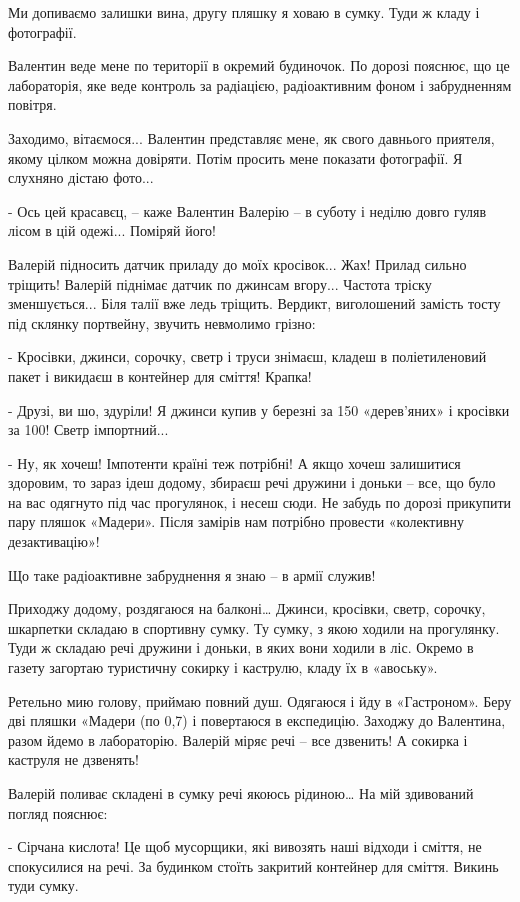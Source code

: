 Ми допиваємо залишки вина, другу пляшку я ховаю в сумку. Туди ж кладу і
фотографії. 

Валентин веде мене по території в окремий будиночок. По дорозі пояснює, що це
лабораторія, яке веде контроль за радіацією, радіоактивним фоном і забрудненням
повітря. 

Заходимо, вітаємося... Валентин представляє мене, як свого давнього приятеля,
якому цілком можна довіряти. Потім просить мене показати фотографії. Я слухняно
дістаю фото... 

- Ось цей красавєц, – каже Валентин Валерію – в суботу і неділю довго гуляв
лісом в цій одежі... Поміряй його!

Валерій підносить датчик приладу до моїх кросівок... Жах! Прилад сильно тріщить!
Валерій піднімає датчик по джинсам вгору... Частота тріску зменшується... Біля
талії вже ледь тріщить. Вердикт, виголошений замість тосту під склянку
портвейну, звучить невмолимо грізно:

- Кросівки, джинси, сорочку, светр і труси знімаєш, кладеш в поліетиленовий
пакет і викидаєш в контейнер для сміття! Крапка!

- Друзі, ви шо, здуріли! Я джинси купив у березні за 150 «дерев’яних» і
кросівки за 100! Светр імпортний... 

- Ну, як хочеш! Імпотенти країні теж потрібні! А якщо хочеш залишитися
здоровим, то зараз ідеш додому, збираєш речі дружини і доньки – все, що було на
вас одягнуто під час прогулянок, і несеш сюди. Не забудь по дорозі прикупити
пару пляшок «Мадери». Після замірів нам потрібно провести «колективну
дезактивацію»!

Що таке радіоактивне забруднення я знаю – в армії служив!

Приходжу додому, роздягаюся на балконі… Джинси, кросівки, светр, сорочку,
шкарпетки складаю в спортивну сумку. Ту сумку, з якою ходили на прогулянку.
Туди ж складаю речі дружини і доньки, в яких вони ходили в ліс. Окремо в газету
загортаю туристичну сокирку і каструлю, кладу їх в «авоську». 

Ретельно мию голову, приймаю повний душ. Одягаюся і йду в «Гастроном». Беру дві
пляшки «Мадери (по 0,7) і повертаюся в експедицію. Заходжу до Валентина, разом
йдемо в лабораторію. Валерій міряє речі – все дзвенить! А сокирка і каструля не
дзвенять!

Валерій поливає складені в сумку речі якоюсь рідиною… На мій здивований погляд
пояснює:

- Сірчана кислота! Це щоб мусорщики, які вивозять наші відходи і сміття, не
спокусилися на речі. За будинком стоїть закритий контейнер для сміття. Викинь
туди сумку.


